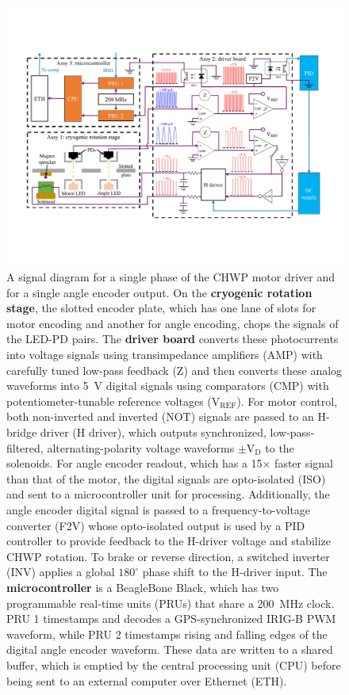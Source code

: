 \begin{figure}[!t]
    \includegraphics[width=\linewidth, trim=1.5cm 3.8cm 1.5cm 3.5cm, clip]{CHWPDesign/Figures/motorDriver_schematic.pdf}
    \caption{A signal diagram for a single phase of the CHWP motor driver and for a single angle encoder output. On the \textbf{cryogenic rotation stage}, the slotted encoder plate, which has one lane of slots for motor encoding and another for angle encoding, chops the signals of the LED-PD pairs. The \textbf{driver board} converts these photocurrents into voltage signals using transimpedance amplifiers (AMP) with carefully tuned low-pass feedback (Z) and then converts these analog waveforms into 5~V digital signals using comparators (CMP) with potentiometer-tunable reference voltages ($\mathrm{V_{REF}}$). For motor control, both non-inverted and inverted (NOT) signals are passed to an H-bridge driver (H driver), which outputs synchronized, low-pass-filtered, alternating-polarity voltage waveforms $\pm \mathrm{V_{D}}$ to the solenoids. For angle encoder readout, which has a 15$\times$ faster signal than that of the motor, the digital signals are opto-isolated (ISO) and sent to a microcontroller unit for processing. Additionally, the angle encoder digital signal is passed to a frequency-to-voltage converter (F2V) whose opto-isolated output is used by a PID controller to provide feedback to the H-driver voltage and stabilize CHWP rotation. To brake or reverse direction, a switched inverter (INV) applies a global $180^{\circ}$ phase shift to the H-driver input. The \textbf{microcontroller} is a BeagleBone Black, which has two programmable real-time units (PRUs) that share a 200~MHz clock. PRU 1 timestamps and decodes a GPS-synchronized IRIG-B PWM waveform, while PRU 2 timestamps rising and falling edges of the digital angle encoder waveform. These data are written to a shared buffer, which is emptied by the central processing unit (CPU) before being sent to an external computer over Ethernet (ETH).}
    \label{fig:motor_driver_schematic}
\end{figure}

